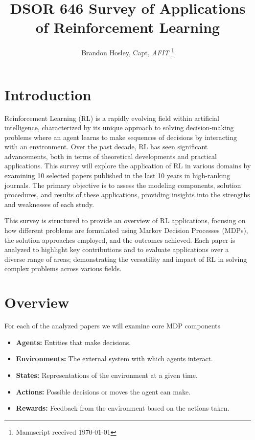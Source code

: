 \documentclass[journal]{IEEEtran}
\title{DSOR 646 Survey of Applications of Reinforcement Learning}
\author{Brandon Hosley, Capt, \textit{AFIT}%
    \thanks{Manuscript received \today%
}}
\begin{document}
\maketitle
\begin{abstract}
\end{abstract}
\section{Introduction}
\label{sec:introduction}

Reinforcement Learning (RL) is a rapidly evolving field within artificial intelligence, 
characterized by its unique approach to solving decision-making problems where an agent 
learns to make sequences of decisions by interacting with an environment. 
Over the past decade, RL has seen significant advancements, 
both in terms of theoretical developments and practical applications. 
This survey will explore the application of RL in various domains by examining 10 
selected papers published in the last 10 years in high-ranking journals. 
The primary objective is to assess the modeling components, solution procedures, and results 
of these applications, providing insights into the strengths and weaknesses of each study.

This survey is structured to provide an overview of RL applications, focusing on how 
different problems are formulated using Markov Decision Processes (MDPs), 
the solution approaches employed, and the outcomes achieved. Each paper is analyzed to 
highlight key contributions and to evaluate applications over a diverse range of areas; 
demonstrating the versatility and impact of RL in solving complex problems across various fields.

\section{Overview}
\label{sec:overview}

For each of the analyzed papers we will examine core MDP components




\begin{itemize}
    \item \textbf{Agents:} Entities that make decisions.
    \item \textbf{Environments:} The external system with which agents interact.
    \item \textbf{States:} Representations of the environment at a given time.
    \item \textbf{Actions:} Possible decisions or moves the agent can make.
    \item \textbf{Rewards:} Feedback from the environment based on the actions taken.
\end{itemize}
\end{document}

